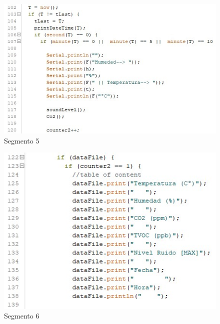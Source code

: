 \begin{flushleft}
    \begin{figure}[H]
        \includegraphics{imagenes/codigo5.jpg}
        \caption*{Segmento 5}
    \end{figure}
    
    \begin{figure}[H]
        \includegraphics{imagenes/codigo6.jpg}
        \caption*{Segmento 6}
    \end{figure}


\end{flushleft}
